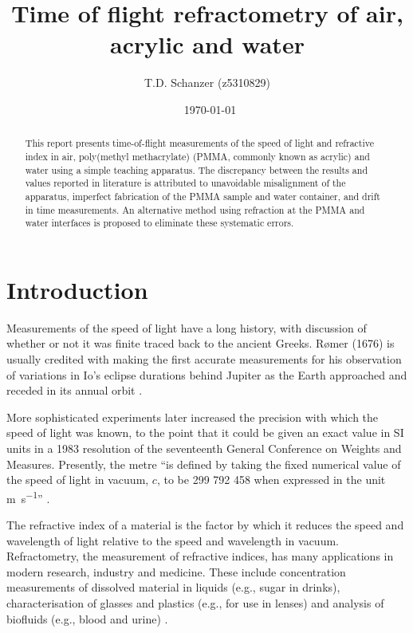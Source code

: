 \documentclass[
    aps,
    prl,
    reprint,
    10pt,
    amsmath,
    amssymb,
    a4paper,
    longbibliography
]{revtex4-2}
\begin{document}
\title{Time of flight refractometry of air, acrylic and water}
\author{T.D. Schanzer (z5310829)}
\noaffiliation
{}
\noaffiliation
\date{\currenttime~\today}

\begin{abstract}
    This report presents time-of-flight measurements of the speed of
    light and refractive
    index in air, poly(methyl methacrylate) (PMMA, commonly known as
    acrylic) and water using a simple teaching apparatus.
    The discrepancy between the results and values reported in literature
    is attributed to unavoidable misalignment of the apparatus, imperfect
    fabrication of
    the PMMA sample and water container, and drift in time measurements.
    An alternative method using refraction at the PMMA and water
    interfaces is proposed to eliminate these systematic errors.
\end{abstract}

\maketitle

\section{Introduction}

Measurements of the speed of light have a long history, with discussion of
whether or not it was finite traced back to the ancient Greeks.
R{\o}mer (1676) is usually credited with making the first accurate
measurements for his observation of variations in Io's eclipse durations
behind Jupiter as the Earth approached and receded in its annual orbit
\cite{spence_history}.

More sophisticated experiments later increased the precision with which
the speed of light was known, to the point that it could be given an
exact value in SI units in a 1983
resolution of the seventeenth General Conference on Weights and Measures.
Presently, the metre ``is defined by taking
the fixed numerical value of the speed of light in vacuum, $c$, to be
299 792 458 when expressed in the unit \si{\meter \per\second}''
\cite{sibrochure}.

The refractive index of a material is the factor by which it reduces the
speed and wavelength of light relative to the speed and wavelength in
vacuum. Refractometry, the measurement of refractive indices, has many
applications in modern research, industry and medicine. These include
concentration measurements of dissolved material in liquids (e.g., sugar
in drinks), characterisation of glasses and plastics (e.g., for use in
lenses) and analysis of biofluids (e.g., blood and urine)
\cite{meeten_measurement}.
\end{document}
